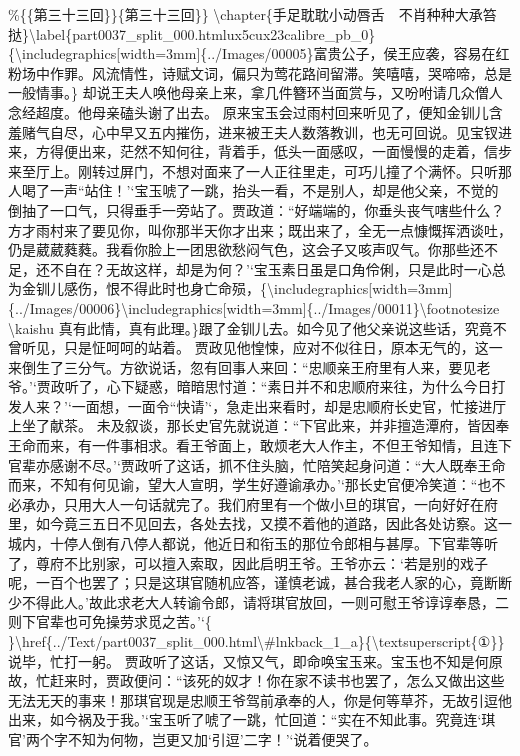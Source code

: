 \%\{\{第三十三回\}\}\{第三十三回\}\}
\textbackslash{}chapter\{手足耽耽小动唇舌　不肖种种大承笞挞\}\textbackslash{}label\{part0037\_split\_000.htmlux5cux23calibre\_pb\_0\}
\{\textbackslash{}includegraphics{[}width=3mm{]}\{../Images/00005\}富贵公子，侯王应袭，容易在红粉场中作罪。风流情性，诗赋文词，偏只为莺花路间留滞。笑嘻嘻，哭啼啼，总是一般情事。\}
却说王夫人唤他母亲上来，拿几件簪环当面赏与，又吩咐请几众僧人念经超度。他母亲磕头谢了出去。
原来宝玉会过雨村回来听见了，便知金钏儿含羞赌气自尽，心中早又五内摧伤，进来被王夫人数落教训，也无可回说。见宝钗进来，方得便出来，茫然不知何往，背着手，低头一面感叹，一面慢慢的走着，信步来至厅上。刚转过屏门，不想对面来了一人正往里走，可巧儿撞了个满怀。只听那人喝了一声``站住！'`宝玉唬了一跳，抬头一看，不是别人，却是他父亲，不觉的倒抽了一口气，只得垂手一旁站了。贾政道：``好端端的，你垂头丧气嗐些什么？方才雨村来了要见你，叫你那半天你才出来；既出来了，全无一点慷慨挥洒谈吐，仍是葳葳蕤蕤。我看你脸上一团思欲愁闷气色，这会子又咳声叹气。你那些还不足，还不自在？无故这样，却是为何？'`宝玉素日虽是口角伶俐，只是此时一心总为金钏儿感伤，恨不得此时也身亡命殒，\{\textbackslash{}includegraphics{[}width=3mm{]}\{../Images/00006\}\textbackslash{}includegraphics{[}width=3mm{]}\{../Images/00011\}\textbackslash{}footnotesize
\textbackslash{}kaishu
真有此情，真有此理。\}跟了金钏儿去。如今见了他父亲说这些话，究竟不曾听见，只是怔呵呵的站着。
贾政见他惶悚，应对不似往日，原本无气的，这一来倒生了三分气。方欲说话，忽有回事人来回：``忠顺亲王府里有人来，要见老爷。'`贾政听了，心下疑惑，暗暗思忖道：``素日并不和忠顺府来往，为什么今日打发人来？'`一面想，一面令``快请'`，急走出来看时，却是忠顺府长史官，忙接进厅上坐了献茶。
未及叙谈，那长史官先就说道：``下官此来，并非擅造潭府，皆因奉王命而来，有一件事相求。看王爷面上，敢烦老大人作主，不但王爷知情，且连下官辈亦感谢不尽。'`贾政听了这话，抓不住头脑，忙陪笑起身问道：``大人既奉王命而来，不知有何见谕，望大人宣明，学生好遵谕承办。'`那长史官便冷笑道：``也不必承办，只用大人一句话就完了。我们府里有一个做小旦的琪官，一向好好在府里，如今竟三五日不见回去，各处去找，又摸不着他的道路，因此各处访察。这一城内，十停人倒有八停人都说，他近日和衔玉的那位令郎相与甚厚。下官辈等听了，尊府不比别家，可以擅入索取，因此启明王爷。王爷亦云：`若是别的戏子呢，一百个也罢了；只是这琪官随机应答，谨慎老诚，甚合我老人家的心，竟断断少不得此人。'故此求老大人转谕令郎，请将琪官放回，一则可慰王爷谆谆奉恳，二则下官辈也可免操劳求觅之苦。'`\{
\}\textbackslash{}href\{../Text/part0037\_split\_000.html\textbackslash{}\#lnkback\_1\_a\}\{\textbackslash{}textsuperscript\{①\}\}说毕，忙打一躬。
贾政听了这话，又惊又气，即命唤宝玉来。宝玉也不知是何原故，忙赶来时，贾政便问：``该死的奴才！你在家不读书也罢了，怎么又做出这些无法无天的事来！那琪官现是忠顺王爷驾前承奉的人，你是何等草芥，无故引逗他出来，如今祸及于我。'`宝玉听了唬了一跳，忙回道：``实在不知此事。究竟连`琪官'两个字不知为何物，岂更又加`引逗'二字！'`说着便哭了。
